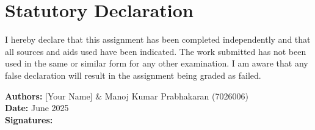 \chapter*{Statutory Declaration}

I hereby declare that this assignment has been completed independently and that all sources and aids used have been indicated. The work submitted has not been used in the same or similar form for any other examination. I am aware that any false declaration will result in the assignment being graded as failed.

\vspace{2cm}

\textbf{Authors:} [Your Name] \& Manoj Kumar Prabhakaran (7026006)\\[0.5cm]
\textbf{Date:} June 2025\\[1cm]
\textbf{Signatures:} \underline{\hspace{4cm}} \underline{\hspace{4cm}}